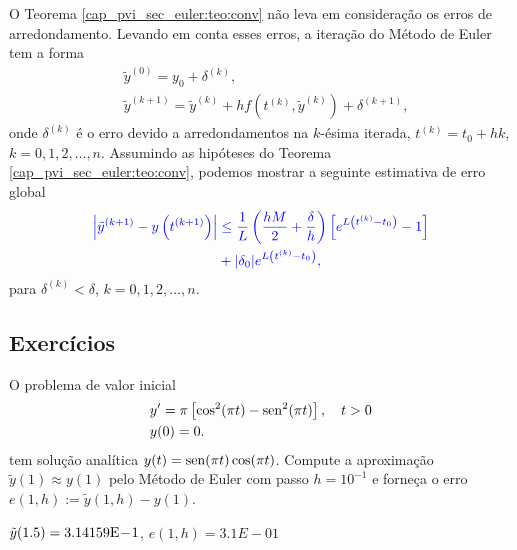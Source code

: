 O Teorema \ref{cap_pvi_sec_euler:teo:conv} não leva em consideração os erros de arredondamento. Levando em conta esses erros, a iteração do Método de Euler tem a forma
\begin{subequations}\label{cap_pvi_sec_euler:eq:euler_errarr}
  \begin{align}
    &\tilde{y}^{(0)} = y_0 + \delta^{(k)},\\
    &\tilde{y}^{(k+1)} = \tilde{y}^{(k)} + hf\left(t^{(k)}, \tilde{y}^{(k)}\right) + \delta^{(k+1)},
  \end{align}
\end{subequations}
onde $\delta^{(k)}$ é o erro devido a arredondamentos na $k$-ésima iterada, $t^{(k)} = t_0 + hk$, $k=0, 1, 2, \dotsc, n$. Assumindo as hipóteses do Teorema \ref{cap_pvi_sec_euler:teo:conv}, podemos mostrar a seguinte estimativa de erro global
\begin{equation}\label{cap_pvi_sec_euler:eq:euler_errarr_est}\color{blue}\begin{aligned}
    \left|\tilde{y}^{(k+1)} - y\left(t^{(k+1)}\right)\right| &\leq \frac{1}{L}\left(\frac{hM}{2} + \frac{\delta}{h}\right)\left[e^{L\left(t^{(k)}-t_0\right)}-1\right]\\
    &+ |\delta_0|e^{L\left(t^{(k)}-t_0\right)},
\end{aligned}
\end{equation}
para $\delta^{(k)} < \delta$, $k=0, 1, 2, \dotsc, n$.

\subsection{Exercícios}

\begin{exer}
  O problema de valor inicial
  \begin{subequations}
    \begin{align}
      &y' = \pi\left[\cos^2(\pi t) - \operatorname{sen}^2(\pi t)\right],\quad t>0\\
      &y(0) = 0.
    \end{align}
  \end{subequations}
  tem solução analítica $y(t) = \operatorname{sen}(\pi t)\cos(\pi t)$. Compute a aproximação $\tilde{y}(1) \approx y(1)$ pelo Método de Euler com passo $h=10^{-1}$ e forneça o erro $e(1, h) := \tilde{y}(1, h) - y(1)$.
\end{exer}
\begin{resp}
  $\tilde{y}(1.5) = 3.14159\mathrm{E}\!-\!1$, $e(1, h) = 3.1E-01$
\end{resp}

